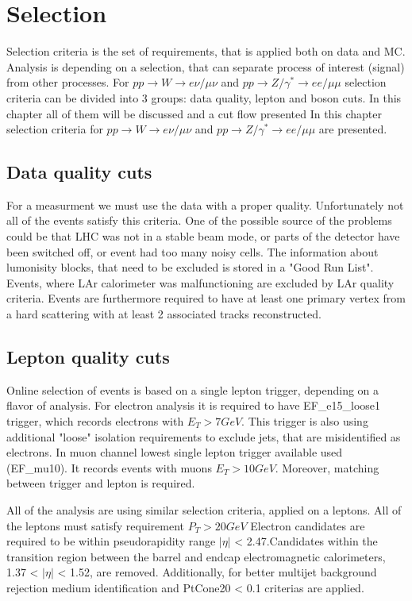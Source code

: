 \chapter{Selection}
Selection criteria is the set of requirements, that is applied both on data and MC. Analysis is depending on a selection, that can separate process of interest (signal) from other processes. For $pp \to W \to e\nu/\mu\nu$ and $pp \to Z/\gamma^* \to ee/\mu\mu$ selection criteria can be divided into 3 groups: data quality, lepton and boson cuts. In this chapter all of them will be discussed and a cut flow presented
In this chapter selection criteria for $pp \to W \to e\nu/\mu\nu$ and $pp \to Z/\gamma^* \to ee/\mu\mu$  are presented.  
\section{Data quality cuts}



For a measurment we must use the data with a proper quality. Unfortunately not all of the events satisfy this criteria. One of the possible source of the problems could be that LHC was not in a stable beam mode, or parts of the detector have been switched off, or event had too many noisy cells. The information about lumonisity blocks, that need to be excluded is stored in a "Good Run List".  Events, where LAr calorimeter was malfunctioning are excluded by LAr quality criteria. 
Events are furthermore required to have at least one primary vertex from a hard scattering with at least 2 associated tracks reconstructed. 

\section{Lepton quality cuts}
Online selection of events is based on a single lepton trigger, depending on a flavor of analysis. For electron analysis it is required to have EF\_e15\_loose1 trigger, which records electrons with $E_T>7 GeV$. This trigger is also using additional "loose" isolation requirements to exclude jets, that are misidentified as electrons. In muon channel lowest single lepton trigger available used (EF\_mu10).  It records events with muons $E_T>10 GeV$.  Moreover, matching between trigger and lepton is required.

All of the analysis are using similar selection criteria, applied on a leptons. All of the leptons must satisfy requirement $P_T > 20 GeV$
Electron candidates are required to be within pseudorapidity range $|\eta|$ < 2.47.Candidates within the transition region between the barrel and endcap electromagnetic calorimeters, 1.37 < $|\eta|$ < 1.52, are removed.  Additionally, for better multijet background rejection  medium identification and PtCone20 < 0.1 criterias are applied.

